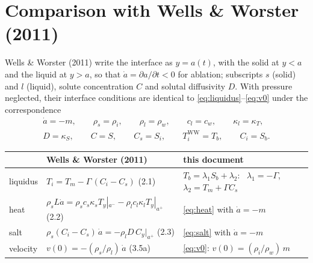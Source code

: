 \documentclass[11pt,a4paper]{article}
\begin{document}
\section{Comparison with Wells \& Worster (2011)}

Wells \& Worster (2011) write the interface as $y=a(t)$, with the solid at $y<a$ and the liquid at
$y>a$, so that $\dot a=\partial a/\partial t<0$ for ablation; subscripts $s$ (solid) and $l$ (liquid),
solute concentration $C$ and solutal diffusivity $D$. With pressure neglected, their interface
conditions are identical to \eqref{eq:liquidus}--\eqref{eq:v0} under the correspondence
\begin{gather*}
  \dot a = -m,\qquad \rho_s=\rho_i,\qquad \rho_l=\rho_w,\qquad c_l=c_w,\qquad \kappa_l=\kappa_T,\\
  D=\kappa_S,\qquad C=S,\qquad C_s=S_i,\qquad T_i^{\mathrm{WW}}=T_b,\qquad C_i=S_b .
\end{gather*}

\begin{center}
\small
\begin{tabular}{l p{7.6cm} p{5.2cm}}
\toprule
 & Wells \& Worster (2011) & this document \\
\midrule
liquidus & $T_i = T_m - \Gamma\,(C_i - C_s)$ \hfill (2.1) & $T_b = \lambda_1 S_b + \lambda_2$:
  \ $\lambda_1=-\Gamma$, $\lambda_2 = T_m + \Gamma C_s$ \\[0.3em]
heat & $\rho_s L \dot a = \rho_s c_s \kappa_s T_y|_{a^-} - \rho_l c_l \kappa_l T_y|_{a^+}$ \hfill (2.2)
  & \eqref{eq:heat} with $\dot a=-m$ \\[0.3em]
salt & $\rho_s (C_i - C_s)\,\dot a = -\rho_l D\, C_y|_{a^+}$ \hfill (2.3) & \eqref{eq:salt} with $\dot a=-m$ \\[0.3em]
velocity & $v(0) = -(\rho_s/\rho_l)\,\dot a$ \hfill (3.5a) & \eqref{eq:v0}: $v(0)=(\rho_i/\rho_w)\,m$ \\
\bottomrule
\end{tabular}
\end{center}
\end{document}

